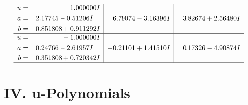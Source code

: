 \documentclass[1p]{elsarticle_modified}
\theoremstyle{definition}
\begin{document}
$$\begin{array}{c|c|c}
\begin{aligned}
u &= \phantom{-0.000000 } -1.000000 I \\
a &= \phantom{-}2.17745 - 0.51206 I \\
b &= -0.851808 + 0.911292 I\end{aligned}
 & \phantom{-}6.79074 - 3.16396 I & \phantom{-}3.82674 + 2.56480 I \\ \hline\begin{aligned}
u &= \phantom{-0.000000 } -1.000000 I \\
a &= \phantom{-}0.24766 - 2.61957 I \\
b &= \phantom{-}0.351808 + 0.720342 I\end{aligned}
 & -0.21101 + 1.41510 I & \phantom{-}0.17326 - 4.90874 I\\
 \hline 
 \end{array}$$\newpage
\newpage\renewcommand{\arraystretch}{1}
\centering \section*{ IV. u-Polynomials}
\end{document}
